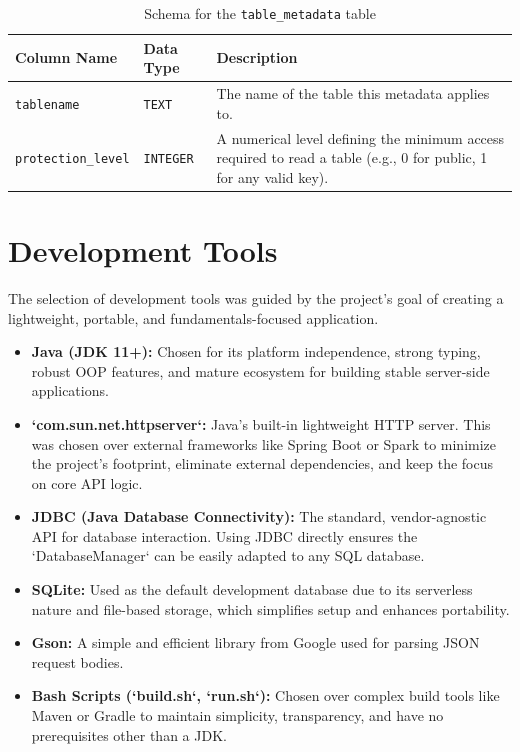 \documentclass[12pt, a4paper]{report}
\begin{document}
\begin{table}[h!]
    \centering
    \caption{Schema for the \lstinline|table_metadata| table}
    \label{tab:table_metadata}
    \begin{tabularx}{\textwidth}{@{} l l X @{}}
        \toprule
        \textbf{Column Name} & \textbf{Data Type} & \textbf{Description} \\
        \midrule
        \lstinline|tablename| & \texttt{TEXT} & The name of the table this metadata applies to.\\%
        \lstinline|protection_level| & \texttt{INTEGER} & A numerical level defining the minimum access required to read a table (e.g., 0 for public, 1 for any valid key). \\
        \bottomrule
    \end{tabularx}
\end{table}
\section{Development Tools}
The selection of development tools was guided by the project's goal of creating a lightweight, portable, and fundamentals-focused application.
\begin{itemize}
    \item \textbf{Java (JDK 11+):} Chosen for its platform independence, strong typing, robust OOP features, and mature ecosystem for building stable server-side applications.
    \item \textbf{`com.sun.net.httpserver`:} Java's built-in lightweight HTTP server. This was chosen over external frameworks like Spring Boot or Spark to minimize the project's footprint, eliminate external dependencies, and keep the focus on core API logic.
    \item \textbf{JDBC (Java Database Connectivity):} The standard, vendor-agnostic API for database interaction. Using JDBC directly ensures the `DatabaseManager` can be easily adapted to any SQL database.
    \item \textbf{SQLite:} Used as the default development database due to its serverless nature and file-based storage, which simplifies setup and enhances portability.
    \item \textbf{Gson:} A simple and efficient library from Google used for parsing JSON request bodies.
    \item \textbf{Bash Scripts (`build.sh`, `run.sh`):} Chosen over complex build tools like Maven or Gradle to maintain simplicity, transparency, and have no prerequisites other than a JDK.
\end{itemize}
\end{document}
